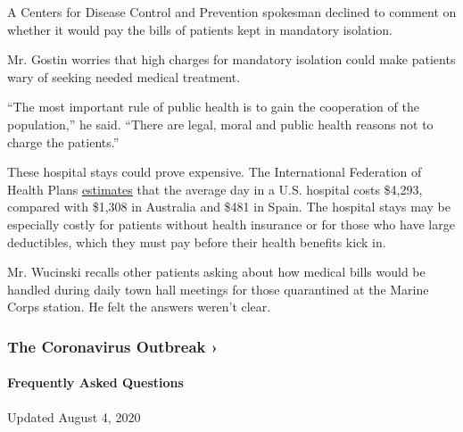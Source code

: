 A Centers for Disease Control and Prevention spokesman declined to
comment on whether it would pay the bills of patients kept in mandatory
isolation.

Mr. Gostin worries that high charges for mandatory isolation could make
patients wary of seeking needed medical treatment.

``The most important rule of public health is to gain the cooperation of
the population,'' he said. ``There are legal, moral and public health
reasons not to charge the patients.''

These hospital stays could prove expensive. The International Federation
of Health Plans
\href{https://s3.amazonaws.com/assets.fiercemarkets.net/public/005-LifeSciences/ifhpreport.pdf}{estimates}
that the average day in a U.S. hospital costs \$4,293, compared with
\$1,308 in Australia and \$481 in Spain. The hospital stays may be
especially costly for patients without health insurance or for those who
have large deductibles, which they must pay before their health benefits
kick in.

Mr. Wucinski recalls other patients asking about how medical bills would
be handled during daily town hall meetings for those quarantined at the
Marine Corps station. He felt the answers weren't clear.

\href{https://www.nytimes.com/news-event/coronavirus?action=click\&pgtype=Article\&state=default\&region=MAIN_CONTENT_3\&context=storylines_faq}{}

\hypertarget{the-coronavirus-outbreak-}{%
\subsubsection{The Coronavirus Outbreak
›}\label{the-coronavirus-outbreak-}}

\hypertarget{frequently-asked-questions}{%
\paragraph{Frequently Asked
Questions}\label{frequently-asked-questions}}

Updated August 4, 2020

